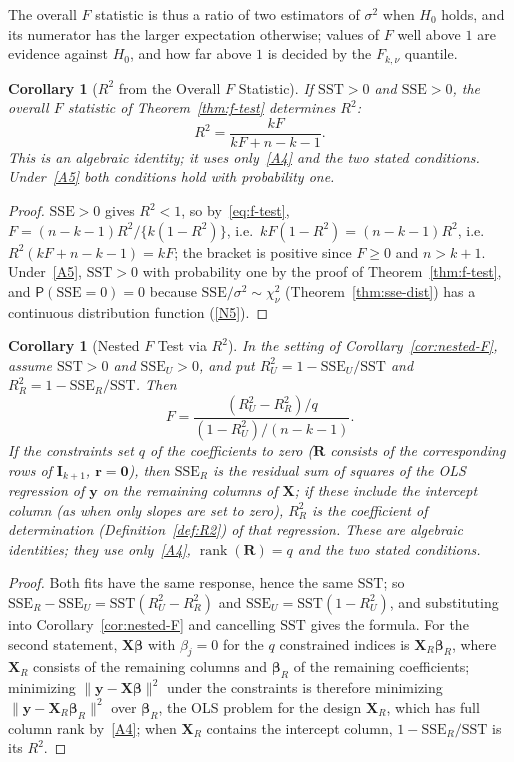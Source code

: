 \documentclass[14pt]{extarticle}
\theoremstyle{plain}
\newtheorem{corollary}[theorem]{Corollary}
\theoremstyle{definition}
\theoremstyle{remark}
\newcommand\prb{\mathsf{P}}
\DeclareMathOperator\rank{rank}
\newcommand{\SST}{\mathrm{SST}}
\newcommand{\SSE}{\mathrm{SSE}}
\newcommand{\bX}{\mathbf{X}}
\newcommand{\by}{\mathbf{y}}
\def\bb{\boldsymbol{\beta}}
\newcommand{\bI}{\mathbf{I}}
\newcommand{\bR}{\mathbf{R}}
\newcommand{\br}{\mathbf{r}}
\newcommand{\bzero}{\mathbf{0}}
\begin{document}
The overall $F$ statistic is thus a ratio of two estimators of $\sigma^2$ when $H_0$ holds, and its numerator has the larger expectation otherwise; values of $F$ well above $1$ are evidence against $H_0$, and how far above $1$ is decided by the $F_{k,\nu}$ quantile.

\begin{corollary}[$R^2$ from the Overall $F$ Statistic]\label{cor:R2-F}
If $\SST > 0$ and $\SSE > 0$, the overall $F$ statistic of Theorem~\ref{thm:f-test} determines $R^2$:
\[
R^2 = \frac{kF}{kF + n - k - 1}.
\]
This is an algebraic identity; it uses only~\ref{A4} and the two stated conditions. Under~\ref{A5} both conditions hold with probability one.
\end{corollary}

\begin{proof}
$\SSE > 0$ gives $R^2 < 1$, so by~\eqref{eq:f-test}, $F = (n-k-1)R^2/\{k(1 - R^2)\}$, i.e.\ $kF(1 - R^2) = (n-k-1)R^2$, i.e.\ $R^2(kF + n - k - 1) = kF$; the bracket is positive since $F \geqslant 0$ and $n > k + 1$. Under~\ref{A5}, $\SST > 0$ with probability one by the proof of Theorem~\ref{thm:f-test}, and $\prb(\SSE = 0) = 0$ because $\SSE/\sigma^2 \sim \chi^2_\nu$ (Theorem~\ref{thm:sse-dist}) has a continuous distribution function (\ref{N5}).
\end{proof}

\begin{corollary}[Nested $F$ Test via $R^2$]\label{cor:nested-R2}
In the setting of Corollary~\ref{cor:nested-F}, assume $\SST > 0$ and $\SSE_U > 0$, and put $R^2_U = 1 - \SSE_U/\SST$ and $R^2_R = 1 - \SSE_R/\SST$. Then
\[
F = \frac{(R^2_U - R^2_R)/q}{(1 - R^2_U)/(n-k-1)}.
\]
If the constraints set $q$ of the coefficients to zero ($\bR$ consists of the corresponding rows of $\bI_{k+1}$, $\br = \bzero$), then $\SSE_R$ is the residual sum of squares of the OLS regression of $\by$ on the remaining columns of $\bX$; if these include the intercept column (as when only slopes are set to zero), $R^2_R$ is the coefficient of determination (Definition~\ref{def:R2}) of that regression. These are algebraic identities; they use only~\ref{A4}, $\rank(\bR) = q$ and the two stated conditions.
\end{corollary}

\begin{proof}
Both fits have the same response, hence the same $\SST$; so $\SSE_R - \SSE_U = \SST(R^2_U - R^2_R)$ and $\SSE_U = \SST(1 - R^2_U)$, and substituting into Corollary~\ref{cor:nested-F} and cancelling $\SST$ gives the formula. For the second statement, $\bX\bb$ with $\beta_j = 0$ for the $q$ constrained indices is $\bX_R\bb_R$, where $\bX_R$ consists of the remaining columns and $\bb_R$ of the remaining coefficients; minimizing $\|\by - \bX\bb\|^2$ under the constraints is therefore minimizing $\|\by - \bX_R\bb_R\|^2$ over $\bb_R$, the OLS problem for the design $\bX_R$, which has full column rank by~\ref{A4}; when $\bX_R$ contains the intercept column, $1 - \SSE_R/\SST$ is its $R^2$.
\end{proof}
\end{document}
